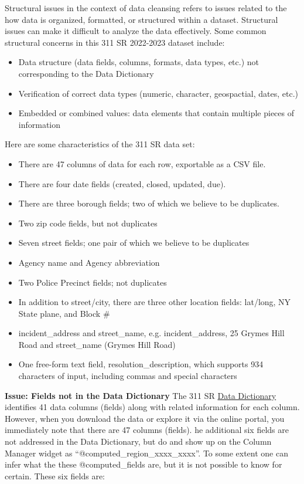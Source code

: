 \documentclass[12pt, titlepage]{article}
\begin{document}
Structural issues in the context of data cleansing refers to issues related to the how data is organized, formatted, or structured within a dataset. Structural issues 
can make it difficult to analyze the data effectively. Some common structural concerns in this 311 SR 2022-2023 dataset include:

\begin{itemize}
	\item Data structure (data fields, columns, formats, data types, etc.) not corresponding to the Data Dictionary
	\item Verification of correct data types (numeric, character, geospactial, dates, etc.)
	\item Embedded or combined values: data elements that contain multiple pieces of information 
\end{itemize}

Here are some characteristics of the 311 SR data set:

\begin{itemize}
	\item There are 47 columns of data for each row, exportable as a CSV file.
	\item There are four date fields (created, closed, updated, due).
	\item There are three borough fields; two of which we believe to be duplicates.
	\item Two zip code fields, but not duplicates
	\item Seven street fields; one pair of which we believe to be duplicates
	\item Agency name and Agency abbreviation
	\item Two Police Precinct fields; not duplicates
	\item In addition to street/city, there are three other location fields: lat/long, NY State plane, and Block \#
	\item incident\_address and street\_name, e.g. incident\_address, 25 Grymes Hill Road and street\_name (Grymes Hill Road)
	\item One free-form text field, resolution\_description, which supports 934 characters of input, including commas and special characters
\end{itemize}


\textbf{Issue: Fields not in the Data Dictionary} The 311 SR \href{https://data.cityofnewyork.us/api/views/erm2-nwe9/files/b372b884-f86a-453b-ba16-1fe06ce9d212?download=true&filename=311_ServiceRequest_2010-Present_DataDictionary_Updated_2023.xlsx}{Data Dictionary}
 identifies 41 data columns (fields) along with related information for each column. 
 However, when you download the data or explore it via the online portal, you immediately note that there are 47 columns (fields).
 he additional six fields are not addressed in the Data Dictionary, but do and show up on the Column Manager widget
 as ``@computed\_region\_xxxx\_xxxx''. To some extent one can infer what the these @computed\_fields are, but it is not possible to know
for certain. These six fields are:
\end{document}
